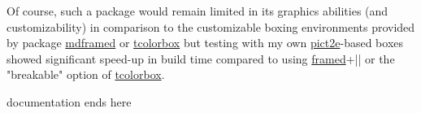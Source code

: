\documentclass[a4paper,dvipdfmx,10pt,english]{article}
\def\ctanpackage#1{\href{https://ctan.org/pkg/#1}{#1}}
\begin{document}
\begin{snugshade}
  Of course, such a package would remain limited in its graphics abilities
  (and customizability) in comparison to the customizable boxing environments
  provided by package \ctanpackage{mdframed} or \ctanpackage{tcolorbox} but
  testing with my own \ctanpackage{pict2e}-based boxes showed significant
  speed-up in build time compared to using \ctanpackage{framed}+|\tcbox| or
  the "breakable" option of \ctanpackage{tcolorbox}.

\end{snugshade}
\centerline{\hrulefill documentation ends here\hrulefill}
\end{document}
